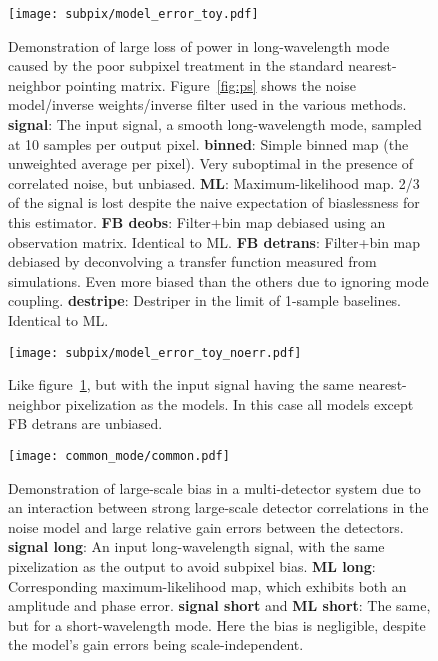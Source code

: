 \documentclass[twocolumn,apj]{aastex63}
\newcommand{\dfn}[1]{\textbf{#1}}
\begin{document}
\begin{figure}
	\centering
	\texttt{[image: subpix/model\_error\_toy.pdf]}
	\caption{
		Demonstration of large loss of power in long-wavelength mode
		caused by the poor subpixel treatment in the standard nearest-neighbor pointing matrix.
		Figure~\ref{fig:ps} shows the noise model/inverse weights/inverse filter
		used in the various methods.
		\dfn{signal}: The input signal, a smooth long-wavelength mode,
		sampled at 10 samples per output pixel.
		\dfn{binned}: Simple binned map (the unweighted average per pixel).
		Very suboptimal in the presence of correlated noise, but unbiased.
		\dfn{ML}: Maximum-likelihood map. 2/3 of the signal is lost despite
		the naive expectation of biaslessness for this estimator.
		\dfn{FB deobs}: Filter+bin map debiased using an observation matrix.
		Identical to ML.
		\dfn{FB detrans}: Filter+bin map debiased by deconvolving a
		transfer function measured from simulations. Even more biased
		than the others due to ignoring mode coupling.
		\dfn{destripe}: Destriper in the limit of 1-sample baselines.
		Identical to ML.
	}
	\label{fig:subpix-bias}
\end{figure}

\begin{figure}
	\centering
	\texttt{[image: subpix/model\_error\_toy\_noerr.pdf]}
	\caption{
		Like figure~\ref{fig:subpix-bias}, but with the input signal
		having the same nearest-neighbor pixelization as the models.
		In this case all models except FB detrans are unbiased.
	}
	\label{fig:subpix-noerr}
\end{figure}

\begin{figure}
	\centering
	\texttt{[image: common\_mode/common.pdf]}
	\caption{
		Demonstration of large-scale bias in a multi-detector system
		due to an interaction between strong large-scale
		detector correlations in the noise model and large
		relative gain errors between the detectors.
		\dfn{signal long}: An input long-wavelength signal,
		with the same pixelization as the output to avoid subpixel bias.
		\dfn{ML long}: Corresponding maximum-likelihood map, which
		exhibits both an amplitude and phase error.
		\dfn{signal short} and \dfn{ML short}: The same, but for a
		short-wavelength mode. Here the bias is negligible,
		despite the model's gain errors being scale-independent.
	}
	\label{fig:common}
\end{figure}



\end{document}
